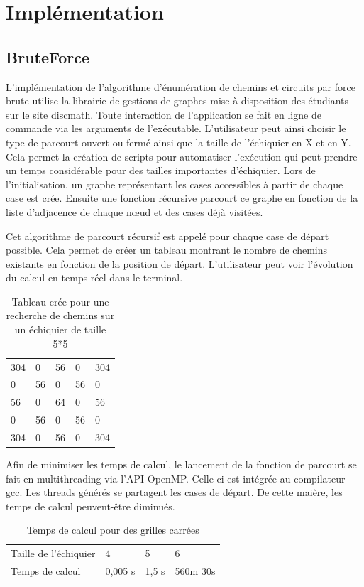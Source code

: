 \section{Implémentation}
\subsection{BruteForce}
L'implémentation de l’algorithme d’énumération de chemins et circuits par force brute utilise la librairie de gestions de graphes mise à disposition des étudiants sur le site discmath. Toute interaction de l’application se fait en ligne de commande via les arguments de l’exécutable. L’utilisateur peut ainsi choisir le type de parcourt ouvert ou fermé ainsi que la taille de l’échiquier en X et en Y.  Cela permet la création de scripts pour automatiser l’exécution qui peut prendre un temps considérable pour des tailles importantes d’échiquier.
Lors de l’initialisation, un graphe représentant les cases accessibles à partir de chaque case est crée. Ensuite une fonction récursive parcourt ce graphe en fonction de la liste d’adjacence de chaque nœud et des cases déjà visitées.

Cet algorithme de parcourt récursif est appelé pour chaque case de départ possible. Cela permet de créer un tableau montrant le nombre de chemins existants en fonction de la position de départ. L’utilisateur peut voir l’évolution du calcul en temps réel dans le terminal.
\begin{table}[H]
\centering
\caption{Tableau crée pour une recherche de chemins sur un échiquier de taille 5*5}
\label{my-label}
\begin{tabular}{lllll}
304 & 0  & 56 & 0  & 304 \\
0   & 56 & 0  & 56 & 0   \\
56  & 0  & 64 & 0  & 56  \\
0   & 56 & 0  & 56 & 0   \\
304 & 0  & 56 & 0  & 304
\end{tabular}
\end{table}

Afin de minimiser les temps de calcul, le lancement de la fonction de parcourt se fait en multithreading via l'API OpenMP. Celle-ci est intégrée au compilateur gcc. Les threads générés se partagent les cases de départ. De cette maière, les temps de calcul peuvent-être diminués.

\begin{table}[H]
\centering
\caption{Temps de calcul pour des grilles carrées}
\label{my-label1}
\begin{tabular}{llll}
\cline{1-1}
\multicolumn{1}{|l|}{Taille de l'échiquier} & 4 & 5     & 6        \\ \cline{1-1}
Temps de calcul                             & 0,005 s  & 1,5 s & 560m 30s
\end{tabular}
\end{table}

